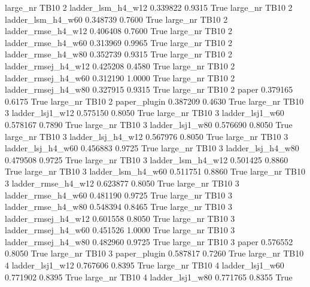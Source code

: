   large_nr     TB10                 2   ladder_lsm_h4_w12    0.339822      0.9315    True
  large_nr     TB10                 2   ladder_lsm_h4_w60    0.348739      0.7600    True
  large_nr     TB10                 2  ladder_rmse_h4_w12    0.406408      0.7600    True
  large_nr     TB10                 2  ladder_rmse_h4_w60    0.313969      0.9965    True
  large_nr     TB10                 2  ladder_rmse_h4_w80    0.352739      0.9315    True
  large_nr     TB10                 2 ladder_rmsej_h4_w12    0.425208      0.4580    True
  large_nr     TB10                 2 ladder_rmsej_h4_w60    0.312190      1.0000    True
  large_nr     TB10                 2 ladder_rmsej_h4_w80    0.327915      0.9315    True
  large_nr     TB10                 2               paper    0.379165      0.6175    True
  large_nr     TB10                 2        paper_plugin    0.387209      0.4630    True
  large_nr     TB10                 3     ladder_lsj1_w12    0.575150      0.8050    True
  large_nr     TB10                 3     ladder_lsj1_w60    0.578167      0.7890    True
  large_nr     TB10                 3     ladder_lsj1_w80    0.576690      0.8050    True
  large_nr     TB10                 3   ladder_lsj_h4_w12    0.567976      0.8050    True
  large_nr     TB10                 3   ladder_lsj_h4_w60    0.456883      0.9725    True
  large_nr     TB10                 3   ladder_lsj_h4_w80    0.479508      0.9725    True
  large_nr     TB10                 3   ladder_lsm_h4_w12    0.501425      0.8860    True
  large_nr     TB10                 3   ladder_lsm_h4_w60    0.511751      0.8860    True
  large_nr     TB10                 3  ladder_rmse_h4_w12    0.623877      0.8050    True
  large_nr     TB10                 3  ladder_rmse_h4_w60    0.481190      0.9725    True
  large_nr     TB10                 3  ladder_rmse_h4_w80    0.548394      0.8465    True
  large_nr     TB10                 3 ladder_rmsej_h4_w12    0.601558      0.8050    True
  large_nr     TB10                 3 ladder_rmsej_h4_w60    0.451526      1.0000    True
  large_nr     TB10                 3 ladder_rmsej_h4_w80    0.482960      0.9725    True
  large_nr     TB10                 3               paper    0.576552      0.8050    True
  large_nr     TB10                 3        paper_plugin    0.587817      0.7260    True
  large_nr     TB10                 4     ladder_lsj1_w12    0.767606      0.8395    True
  large_nr     TB10                 4     ladder_lsj1_w60    0.771902      0.8395    True
  large_nr     TB10                 4     ladder_lsj1_w80    0.771765      0.8355    True
